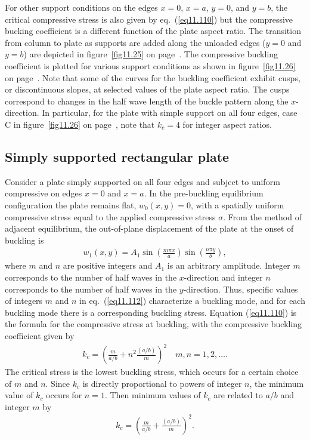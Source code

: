 \documentclass{AeroStructure-ERJohnson}
\begin{document}
\vspace*{-1pc}

For other support conditions on the edges $x=0$, $x=a$, $y=0$, and $y=b$, the critical compressive stress is also given by eq.~(\ref{eq11.110}) but the compressive bucking coefficient is a different function of the plate aspect ratio. The transition from column to plate as supports are added along the unloaded edges ($y=0$ and $y=b$) are depicted in figure~\ref{fig11.25} on page~\pageref{fig11.25}. The compressive buckling coefficient is plotted for various support conditions as shown in figure~\ref{fig11.26} on page~\pageref{fig11.26}. Note that some of the curves for the buckling coefficient exhibit cusps, or discontinuous slopes, at selected values of the plate aspect ratio. The cusps correspond to changes in the half wave length of the buckle pattern along the $x$-direction. In particular, for the plate with simple support on all four edges, case C in figure~\ref{fig11.26} on page~\pageref{fig11.26}, note that $k_{c}=4$ for integer aspect ratios.

\subsection{Simply supported rectangular plate}\label{sec11.7.1}

Consider a plate simply supported on all four edges and subject to uniform compressive on edges $x=0$ and $x=a$. In the pre-buckling equilibrium configuration the plate remains flat, $w_{0}(x, y)=0$, with a spatially uniform compressive stress equal to the applied compressive stress $\sigma$. From the method of adjacent equilibrium, the out-of-plane displacement of the plate at the onset of buckling is
\begin{align}\label{eq11.112}
w_{1}(x, y)=A_{1} \sin \left(\frac{m \pi x}{a}\right) \sin \left(\frac{n \pi y}{b}\right),
\end{align}
where $m$ and $n$ are positive integers and $A_{1}$ is an arbitrary amplitude. Integer $m$ corresponds to the number of half waves in the $x$-direction and integer $n$ corresponds to the number of half waves in the $y$-direction. Thus, specific values of integers $m$ and $n$ in eq.~(\ref{eq11.112}) characterize a buckling mode, and for each buckling mode there is a corresponding buckling stress. Equation (\ref{eq11.110}) is the formula for the compressive stress at buckling, with the compressive buckling coefficient given by
\begin{align}\label{eq11.113}
k_{c}=\left(\frac{m}{a/b}+n^{2} \frac{(a/b)}{m}\right)^{2} \quad m, n=1,2, \ldots.
\end{align}
The critical stress is the lowest buckling stress, which occurs for a certain choice of $m$ and $n$. Since $k_{c}$ is directly proportional to powers of integer $n$, the minimum value of $k_{c}$ occurs for $n=1$. Then minimum values of $k_{c}$ are related to $a/b$  and integer $m$ by
\begin{align}\label{eq11.114}
k_{c}=\left(\frac{m}{a/b}+\frac{(a/b)}{m}\right)^{2}.
\end{align}
\end{document}
